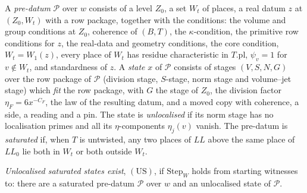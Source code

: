 A \emph{pre-datum} $\mathcal P$ over $w$ consists of
a level $Z_0$, a set $W_t$ of places, a real datum $z$ at $(Z_0,W_t)$ with a row package, together with the conditions: the volume and
group conditions at $Z_0$, coherence of $(B,T)$, the $\kappa$-condition, the primitive row conditions for $z$, the real-data and geometry
conditions, the core condition, $W_t=W_1(z)$, every place of $W_t$ has residue characteristic in $T.\mathrm{pl}$, $\psi_v=1$ for
$v\notin W_t$, and standardness of $z$. A \emph{state} $x$ of $\mathcal P$ consists of stages $(V,S,N,G)$ over the row package of
$\mathcal P$ (division stage, $S$-stage, norm stage and volume--jet stage) which \emph{fit} the row package, with $G$ the stage of $Z_0$,
the division factor $\eta_F=6x^{-C_F}$, the law of the resulting datum, and a moved copy with coherence, a side, a reading and a pin.
The state is \emph{unlocalised} if its norm stage has no localisation primes and all its $\eta$-components $\eta_j(v)$ vanish. The
pre-datum is \emph{saturated} if, when $T$ is untwisted, any two places of $\mathit{LL}$ above the same place of $\mathit{LL}_0$ lie
both in $W_t$ or both outside $W_t$.

\begin{definition}\label{pf:bundles:def:US}
\emph{Unlocalised saturated states exist}, $(\mathrm{US})$, if $\mathrm{Step}_W$ holds from starting witnesses to: there are a
saturated pre-datum $\mathcal P$ over $w$ and an unlocalised state of $\mathcal P$.
\end{definition}

